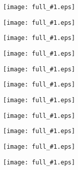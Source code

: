 \documentclass[landscape,a4paper]{article}
\newcommand{\image}[1]{
\begin{figure}%
\texttt{[image: full\_\#1.eps]}
\end{figure}%
}
\begin{document}
\image{000_title}
\image{010_hardware}
\image{020_device}
\image{030_device_cfg}
\image{040_device_spp}
\image{050_graphene}
\image{060_devrole}
\image{070_sweep}
\image{080_bfdata}
\image{091_dev}
\image{090_components}
\end{document}
